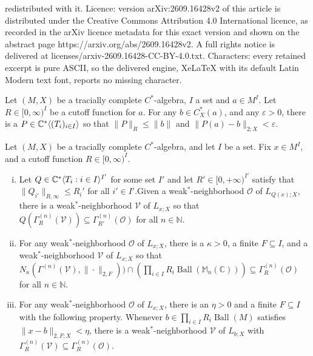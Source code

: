 \documentclass[10pt,a4paper]{amsart}
\DeclareMathOperator{\Ball}{Ball}
\DeclarePairedDelimiter{\ip}{\langle}{\rangle}
\newcommand{\bC}{{\mathbb C}}
\newcommand{\bM}{{\mathbb M}}
\newcommand{\bN}{{\mathbb N}}
\begin{document}
redistributed with it. Licence: version arXiv:2609.16428v2 of this article is distributed under the Creative Commons Attribution 4.0 International licence, as recorded in the arXiv licence metadata for this exact version and shown on the abstract page https://arxiv.org/abs/2609.16428v2. A full rights notice is delivered at licenses/arxiv-2609.16428-CC-BY-4.0.txt. Characters: every retained excerpt is pure ASCII, so the delivered engine, XeLaTeX with its default Latin Modern text font, reports no missing character.
\begin{prop}\label{prop: better KDT}
Let $(M,X)$ be a tracially complete $C^{*}$-algebra, $I$ a set and $a\in M^{I}$. Let $R\in [0,\infty)^{I}$ be a cutoff function for $a$. For any $b\in C^{*}_{X}(a)$, and any $\varepsilon>0$, there is a $P\in \bC^{*}\ip{(T_{i})_{i\in I}}$ so that $\|P\|_{R}\leq \|b\|$ and $\|P(a)-b\|_{2;X}<\varepsilon$. 
\end{prop}

\begin{lem}\label{lem: key lem for invariance}
Let $(M,X)$ be a tracially complete $C^{*}$-algebra, and let $I$ be a set. Fix $x\in M^{I}$, and a cutoff function $R\in [0,\infty)^{I}$. 
\begin{enumerate}[(i)]
\item Let $Q\in \bC^{*}\ip{T_{i}:i\in I}^{I'}$ for some set $I'$ and let $R'\in [0,+\infty)^{I'}$ satisfy that $\|Q_{i'}\|_{R,\infty}\leq R_{i}'$ for all $i'\in I'$.Given a weak$^{*}$-neighborhood $\mathcal{O}$ of $L_{Q(x);X}$, there is a weak$^{*}$-neighborhood $\mathcal{V}$ of $L_{x;X}$ so that $Q(\Gamma^{(n)}_{R}(\mathcal{V}))\subseteq \Gamma^{(n)}_{R'}(\mathcal{O})$ for all $n\in \bN$. \label{item: pushforward neighborhods}
\item For any weak$^{*}$-neighborhood $\mathcal{O}$ of $L_{x;X}$, there is a $\kappa>0$, a finite $F\subseteq I$, and a weak$^{*}$-neighborhood $\mathcal{V}$ of $L_{x;X}$ so that $N_{\kappa}(\Gamma^{(n)}(\mathcal{V}),\|\cdot\|_{2,F}))\cap \left(\prod_{i\in I}R_{i}\Ball(\bM_{n}(\bC))\right)\subseteq \Gamma^{(n)}_{R}(\mathcal{O})$ for all $n\in \bN$. \label{item: small perturbation neighborhood}
\item For any weak$^{*}$-neighborhood $\mathcal{O}$ of $L_{x;X}$, there is an $\eta>0$ and a finite $F\subseteq I$ with the following property. Whenever $b\in \prod_{i\in I}R_{i}\Ball(M)$ satisfies $\|x-b\|_{2,F;X}<\eta$, there is a weak$^{*}$-neighborhood $\mathcal{V}$ of $L_{b;X}$ with $\Gamma^{(n)}_{R}(\mathcal{V})\subseteq \Gamma^{(n)}_{R}(\mathcal{O})$.  \label{item: small perturbation neighborhood 2}
\end{enumerate}
\end{lem}
\end{document}

